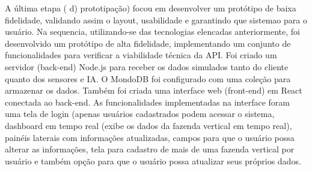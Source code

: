 A última etapa ( d) prototipação) focou em desenvolver um protótipo de baixa fidelidade, validando assim o layout, usabilidade e garantindo que  sistemao para o usuário. Na sequencia, utilizando-se das tecnologias elencadas anteriormente, foi desenvolvido um protótipo de alta fidelidade, implementando um conjunto de funcionalidades para verificar a viabilidade técnica da API. Foi criado um servidor (back-end) Node.js para receber os dados simulados tanto do cliente quanto dos sensores e IA. O MondoDB foi configurado com uma coleção para armazenar os dados. Também foi criada uma interface  web (front-end) em React conectada ao back-end. As funcionalidades implementadas na interface foram uma tela de login (apenas usuários cadastrados podem acessar o sistema,  dashboard em tempo real (exibe os dados da fazenda vertical em tempo real), painéis laterais com informações atualizadas, campos para que o usuário possa alterar as informações, tela para cadastro de mais de uma fazenda vertical por usuário e também opção para que o usuário possa atualizar seus próprios dados.	